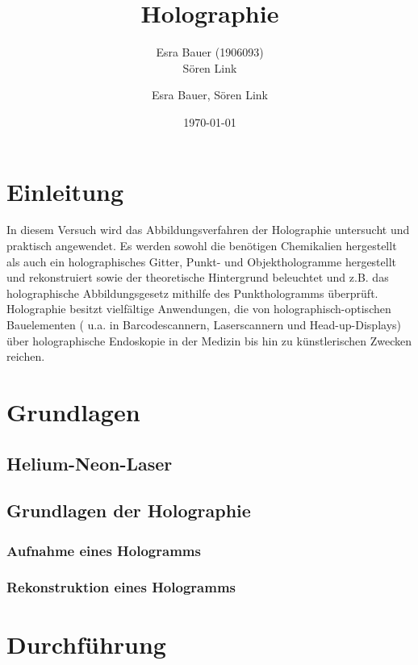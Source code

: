 \documentclass[bigchapter,colorback,accentcolor=tud4b,linedtoc,11pt]{tudreport}
\title{Holographie}
\subtitle{Esra Bauer (1906093) \\Sören Link}
\author{Esra Bauer, Sören Link}
\date{\today}
\begin{document}

\maketitle

\tableofcontents


\chapter{Einleitung}

In diesem Versuch wird das Abbildungsverfahren der Holographie untersucht und praktisch angewendet. Es werden sowohl die benötigen Chemikalien hergestellt als auch ein holographisches Gitter, Punkt- und Objekthologramme hergestellt und rekonstruiert sowie der theoretische Hintergrund beleuchtet und z.B. das holographische Abbildungsgesetz mithilfe des Punkthologramms überprüft. Holographie besitzt vielfältige Anwendungen, die von holographisch-optischen Bauelementen ( u.a. in Barcodescannern, Laserscannern und Head-up-Displays) über holographische Endoskopie in der Medizin bis hin zu künstlerischen Zwecken reichen.

\chapter{Grundlagen}

\section{Helium-Neon-Laser}

\section{Grundlagen der Holographie}

\subsection{Aufnahme eines Hologramms}

\subsection{Rekonstruktion eines Hologramms}

\chapter{Durchführung}
\end{document}
